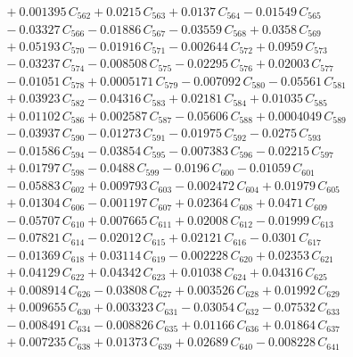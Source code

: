 \documentclass[a4paper,11pt]{article}
\begin{document}
\begin{align}
&\quad + 0.001395\,C_{562} + 0.0215\,C_{563} + 0.0137\,C_{564} - 0.01549\,C_{565} \nonumber\\
&\quad - 0.03327\,C_{566} - 0.01886\,C_{567} - 0.03559\,C_{568} + 0.0358\,C_{569} \nonumber\\
&\quad + 0.05193\,C_{570} - 0.01916\,C_{571} - 0.002644\,C_{572} + 0.0959\,C_{573} \nonumber\\
&\quad - 0.03237\,C_{574} - 0.008508\,C_{575} - 0.02295\,C_{576} + 0.02003\,C_{577} \nonumber\\
&\quad - 0.01051\,C_{578} + 0.0005171\,C_{579} - 0.007092\,C_{580} - 0.05561\,C_{581} \nonumber\\
&\quad + 0.03923\,C_{582} - 0.04316\,C_{583} + 0.02181\,C_{584} + 0.01035\,C_{585} \nonumber\\
&\quad + 0.01102\,C_{586} + 0.002587\,C_{587} - 0.05606\,C_{588} + 0.0004049\,C_{589} \nonumber\\
&\quad - 0.03937\,C_{590} - 0.01273\,C_{591} - 0.01975\,C_{592} - 0.0275\,C_{593} \nonumber\\
&\quad - 0.01586\,C_{594} - 0.03854\,C_{595} - 0.007383\,C_{596} - 0.02215\,C_{597} \nonumber\\
&\quad + 0.01797\,C_{598} - 0.0488\,C_{599} - 0.0196\,C_{600} - 0.01059\,C_{601} \nonumber\\
&\quad - 0.05883\,C_{602} + 0.009793\,C_{603} - 0.002472\,C_{604} + 0.01979\,C_{605} \nonumber\\
&\quad + 0.01304\,C_{606} - 0.001197\,C_{607} + 0.02364\,C_{608} + 0.0471\,C_{609} \nonumber\\
&\quad - 0.05707\,C_{610} + 0.007665\,C_{611} + 0.02008\,C_{612} - 0.01999\,C_{613} \nonumber\\
&\quad - 0.07821\,C_{614} - 0.02012\,C_{615} + 0.02121\,C_{616} - 0.0301\,C_{617} \nonumber\\
&\quad - 0.01369\,C_{618} + 0.03114\,C_{619} - 0.002228\,C_{620} + 0.02353\,C_{621} \nonumber\\
&\quad + 0.04129\,C_{622} + 0.04342\,C_{623} + 0.01038\,C_{624} + 0.04316\,C_{625} \nonumber\\
&\quad + 0.008914\,C_{626} - 0.03808\,C_{627} + 0.003526\,C_{628} + 0.01992\,C_{629} \nonumber\\
&\quad + 0.009655\,C_{630} + 0.003323\,C_{631} - 0.03054\,C_{632} - 0.07532\,C_{633} \nonumber\\
&\quad - 0.008491\,C_{634} - 0.008826\,C_{635} + 0.01166\,C_{636} + 0.01864\,C_{637} \nonumber\\
&\quad + 0.007235\,C_{638} + 0.01373\,C_{639} + 0.02689\,C_{640} - 0.008228\,C_{641} \nonumber\\

\end{align}
\end{document}

